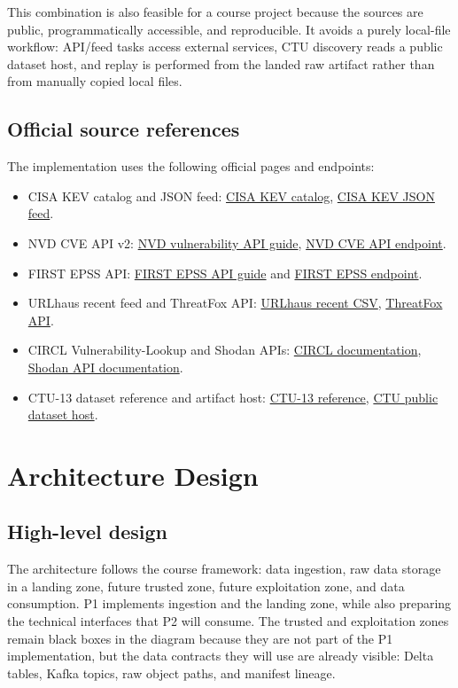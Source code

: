 \documentclass[11pt,a4paper]{article}
\begin{document}
This combination is also feasible for a course project because the sources are public, programmatically accessible, and reproducible. It avoids a purely local-file workflow: API/feed tasks access external services, CTU discovery reads a public dataset host, and replay is performed from the landed raw artifact rather than from manually copied local files.

\subsection{Official source references}
The implementation uses the following official pages and endpoints:
{\small
\begin{itemize}
  \item CISA KEV catalog and JSON feed: \href{https://www.cisa.gov/known-exploited-vulnerabilities}{CISA KEV catalog}, \href{https://www.cisa.gov/sites/default/files/feeds/known_exploited_vulnerabilities.json}{CISA KEV JSON feed}.
  \item NVD CVE API v2: \href{https://nvd.nist.gov/developers/vulnerabilities}{NVD vulnerability API guide}, \href{https://services.nvd.nist.gov/rest/json/cves/2.0}{NVD CVE API endpoint}.
  \item FIRST EPSS API: \href{https://www.first.org/epss/api}{FIRST EPSS API guide} and \href{https://api.first.org/data/v1/epss}{FIRST EPSS endpoint}.
  \item URLhaus recent feed and ThreatFox API: \href{https://urlhaus.abuse.ch/downloads/csv_recent/}{URLhaus recent CSV}, \href{https://threatfox.abuse.ch/api/}{ThreatFox API}.
  \item CIRCL Vulnerability-Lookup and Shodan APIs: \href{https://vulnerability.circl.lu/documentation}{CIRCL documentation}, \href{https://developer.shodan.io/api}{Shodan API documentation}.
  \item CTU-13 dataset reference and artifact host: \href{https://www.stratosphereips.org/datasets-ctu13}{CTU-13 reference}, \href{https://mcfp.felk.cvut.cz/publicDatasets/}{CTU public dataset host}.
\end{itemize}
}

\section{Architecture Design}

\subsection{High-level design}
The architecture follows the course framework: data ingestion, raw data storage in a landing zone, future trusted zone, future exploitation zone, and data consumption. P1 implements ingestion and the landing zone, while also preparing the technical interfaces that P2 will consume. The trusted and exploitation zones remain black boxes in the diagram because they are not part of the P1 implementation, but the data contracts they will use are already visible: Delta tables, Kafka topics, raw object paths, and manifest lineage.
\end{document}
